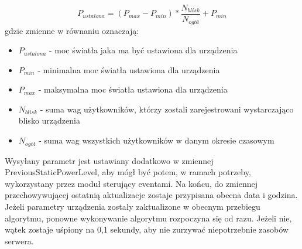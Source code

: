 \documentclass{article}
\begin{document}
		\begin{equation}
		P_{ustalona} = (P_{max} - P_{min}) * \frac{N_{blisk}}{N_{ogół}} + P_{min}
		\end{equation}
		gdzie zmienne w równaniu oznaczają:
		\begin{itemize}
			\item $P_{ustalona}$ - moc światła jaka ma być ustawiona dla urządzenia
			\item $P_{min}$ - minimalna moc światła ustawiona dla urządzenia
			\item $P_{max}$ - maksymalna moc światła ustawiona dla urządzenia
			\item $N_{blisk}$ - suma wag użytkowników, którzy zostali zarejestrowani wystarczająco blisko urządzenia
			\item $N_{ogół}$ - suma wag wszystkich użytkowników w danym okresie czasowym
		\end{itemize}
		Wysyłany parametr jest ustawiany dodatkowo w zmiennej PreviousStaticPowerLevel, aby mógł być potem, w ramach potrzeby, wykorzystany przez moduł sterujący eventami. Na końcu, do zmiennej przechowywującej ostatnią aktualizacje zostaje przypisana obecna data i godzina.\\
		Jeżeli parametry urządzenia zostały zaktualizone w obecnym przebiegu algorytmu, ponowne wykonywanie algorytmu rozpoczyna się od razu. Jeżeli nie, wątek zostaje uśpiony na 0,1 sekundy, aby nie zurzywać niepotrzebnie zasobów serwera.
\end{document}
